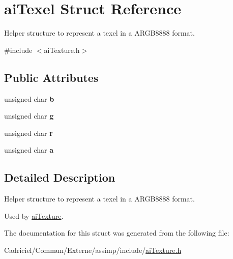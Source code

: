 \hypertarget{structai_texel}{\section{ai\-Texel Struct Reference}
\label{structai_texel}
}


Helper structure to represent a texel in a A\-R\-G\-B8888 format.  




{\ttfamily \#include $<$ai\-Texture.\-h$>$}

\subsection*{Public Attributes}
\begin{DoxyCompactItemize}
\item 
\hypertarget{structai_texel_a5b4f97f69cf59cb9065af67389599ba6}{unsigned char {\bfseries b}}\label{structai_texel_a5b4f97f69cf59cb9065af67389599ba6}

\item 
\hypertarget{structai_texel_a41da3516b8241165e4ca58ea8ed68fe6}{unsigned char {\bfseries g}}\label{structai_texel_a41da3516b8241165e4ca58ea8ed68fe6}

\item 
\hypertarget{structai_texel_ae9408c0d18f6ff597715cc626398a0ff}{unsigned char {\bfseries r}}\label{structai_texel_ae9408c0d18f6ff597715cc626398a0ff}

\item 
\hypertarget{structai_texel_a6d4450e83b02b29d24f7aab27958034e}{unsigned char {\bfseries a}}\label{structai_texel_a6d4450e83b02b29d24f7aab27958034e}

\end{DoxyCompactItemize}


\subsection{Detailed Description}
Helper structure to represent a texel in a A\-R\-G\-B8888 format. 

Used by \hyperlink{structai_texture}{ai\-Texture}. 

The documentation for this struct was generated from the following file\-:\begin{DoxyCompactItemize}
\item 
Cadriciel/\-Commun/\-Externe/assimp/include/\hyperlink{ai_texture_8h}{ai\-Texture.\-h}\end{DoxyCompactItemize}
